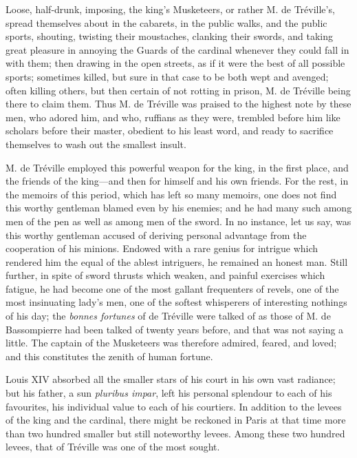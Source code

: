 Loose, half-drunk, imposing, the king's Musketeers, or rather M. de Tréville's, spread themselves about in the cabarets, in the public walks, and the public sports, shouting, twisting their moustaches, clanking their swords, and taking great pleasure in annoying the Guards of the cardinal whenever they could fall in with them; then drawing in the open streets, as if it were the best of all possible sports; sometimes killed, but sure in that case to be both wept and avenged; often killing others, but then certain of not rotting in prison, M. de Tréville being there to claim them. Thus M. de Tréville was praised to the highest note by these men, who adored him, and who, ruffians as they were, trembled before him like scholars before their master, obedient to his least word, and ready to sacrifice themselves to wash out the smallest insult. 

M. de Tréville employed this powerful weapon for the king, in the first place, and the friends of the king---and then for himself and his own friends. For the rest, in the memoirs of this period, which has left so many memoirs, one does not find this worthy gentleman blamed even by his enemies; and he had many such among men of the pen as well as among men of the sword. In no instance, let us say, was this worthy gentleman accused of deriving personal advantage from the cooperation of his minions. Endowed with a rare genius for intrigue which rendered him the equal of the ablest intriguers, he remained an honest man. Still further, in spite of sword thrusts which weaken, and painful exercises which fatigue, he had become one of the most gallant frequenters of revels, one of the most insinuating lady's men, one of the softest whisperers of interesting nothings of his day; the \textit{bonnes fortunes} of de Tréville were talked of as those of M. de Bassompierre had been talked of twenty years before, and that was not saying a little. The captain of the Musketeers was therefore admired, feared, and loved; and this constitutes the zenith of human fortune. 

Louis XIV absorbed all the smaller stars of his court in his own vast radiance; but his father, a sun \textit{pluribus impar}, left his personal splendour to each of his favourites, his individual value to each of his courtiers. In addition to the levees of the king and the cardinal, there might be reckoned in Paris at that time more than two hundred smaller but still noteworthy levees. Among these two hundred levees, that of Tréville was one of the most sought. 

